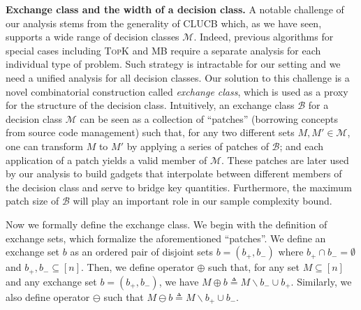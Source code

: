 \documentclass{article}
\newcommand{\Algorithm}{{\small \textsf{CLUCB}}\xspace}
\newcommand{\M}{\mathcal M}
\newcommand{\B}{\mathcal B}
\newcommand{\del}{\backslash}
\newcommand{\MultiIdent}{\textsc{TopK}\xspace}
\newcommand{\MultiBandit}{\textsc{MB}\xspace}
\begin{document}
\textbf{Exchange class and the width of a decision class.} 
A notable challenge of our analysis stems from the generality of \Algorithm which, as we have seen, supports a wide range of decision classes $\M$.
Indeed, previous algorithms for special cases including \MultiIdent and \MultiBandit require a separate analysis for each individual type of problem.
Such strategy is intractable for our setting and we need a unified analysis for all decision classes.
Our solution to this challenge is a novel combinatorial construction called \emph{exchange class}, which is used as a proxy for the structure of the decision class.
Intuitively, an exchange class $\B$ for a decision class $\M$ can be seen as a collection of ``patches'' (borrowing concepts from source code management) such that, for any two different sets $M,M'\in \M$, one can transform $M$ to $M'$ by applying a series of patches of $\B$; and each application of a patch yields a valid member of $\M$.
These patches are later used by our analysis to build gadgets that interpolate between different members of the decision class and serve to bridge key quantities.
Furthermore, the maximum patch size of $\B$ will play an important role in our sample complexity bound.


Now we formally define the exchange class.
We begin with the definition of exchange sets, which formalize the aforementioned ``patches''.
We define an exchange set $b$ as an ordered pair of disjoint sets $b=(b_+,b_-)$ where $b_+\cap b_- = \emptyset$ and $b_+,b_-\subseteq [n]$.
Then, we define operator $\oplus$ such that, for any set $M \subseteq [n]$ and any exchange set $b=(b_+,b_-)$, we have $M\oplus b \triangleq M\del b_- \cup b_+$.
Similarly, we also define operator $\ominus$ such that $M\ominus b \triangleq M\del b_+\cup b_-$.
\end{document}
